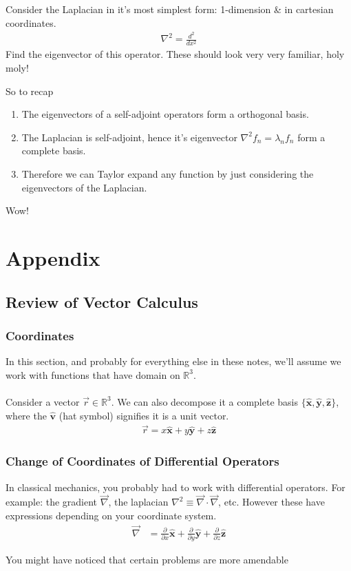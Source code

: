\documentclass[12pt,fleqn]{article}
\numberwithin{equation}{section} %
\newcounter{problem}
\begin{document}
\begin{problem}
	Consider the Laplacian in it's most simplest form: 1-dimension \& in cartesian coordinates.
	\begin{align}
		\nabla^2 = \frac{d^2}{dx^2}
	\end{align} 
	Find the eigenvector of this operator. These should look very very familiar, holy moly!
\end{problem}
So to recap
\begin{enumerate}
	\item The eigenvectors of a self-adjoint operators form a orthogonal basis.
	\item The Laplacian is self-adjoint, hence it's eigenvector $\nabla^2 f_n = \lambda_n f_n$ form a complete basis.
	\item Therefore we can Taylor expand any function by just considering the eigenvectors of the Laplacian.
\end{enumerate}
Wow!





\newpage
\section{Appendix}

\subsection{Review of Vector Calculus}
\subsubsection{Coordinates}
In this section, and probably for everything else in these notes, we'll assume we work with functions that have domain on $\mathbb R^3$.\\
\\
Consider a vector $\vec r \in \mathbb R^3$. We can also decompose it a complete basis $\{\mathbf{\hat x}, \mathbf{\hat y}, \mathbf{\hat z}\}$, where the $\mathbf{\hat v}$ (hat symbol) signifies it is a unit vector.
\begin{align}
	\vec r  = x \mathbf{\hat x} + y \mathbf{\hat y} + z \mathbf {\hat z}
\end{align}




\subsubsection{Change of Coordinates of Differential Operators}
In classical mechanics, you probably had to work with differential operators. For example: the gradient $\vec \nabla$, the laplacian $\nabla^2 \equiv \vec \nabla \cdot \vec \nabla$, etc. However these have expressions depending on your coordinate system.
\begin{align}
	\vec \nabla & = \frac{\partial}{\partial x} \mathbf{\hat x} + \frac{\partial}{\partial y} \mathbf{\hat y} + \frac{\partial}{\partial z} \mathbf{\hat z}
\end{align}


 You might have noticed that certain problems are more amendable 
\end{document}
